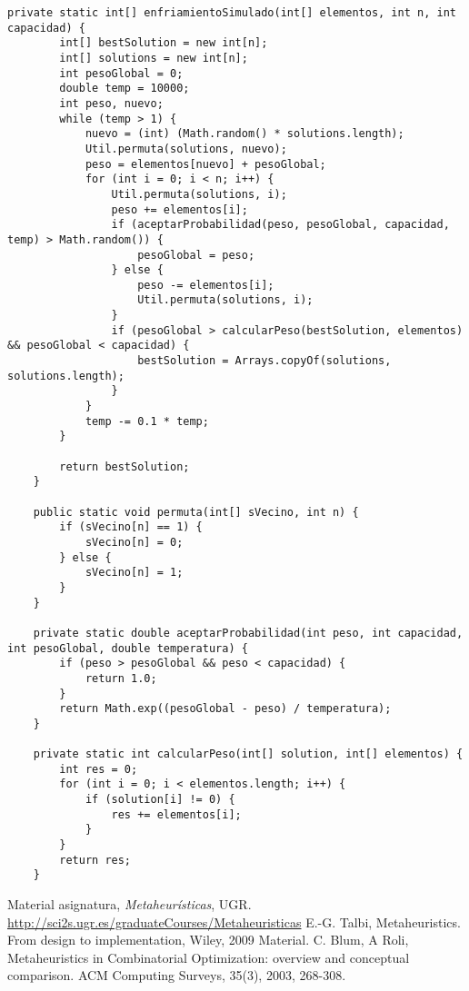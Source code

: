 \documentclass{llncs}
\begin{document}
\lstset{language=Java} 
\begin{lstlisting}
private static int[] enfriamientoSimulado(int[] elementos, int n, int capacidad) {
        int[] bestSolution = new int[n];
        int[] solutions = new int[n];
        int pesoGlobal = 0;
        double temp = 10000;
        int peso, nuevo;
        while (temp > 1) {
            nuevo = (int) (Math.random() * solutions.length);
            Util.permuta(solutions, nuevo);
            peso = elementos[nuevo] + pesoGlobal;
            for (int i = 0; i < n; i++) {
                Util.permuta(solutions, i);
                peso += elementos[i];
                if (aceptarProbabilidad(peso, pesoGlobal, capacidad, temp) > Math.random()) {
                    pesoGlobal = peso;
                } else {
                    peso -= elementos[i];
                    Util.permuta(solutions, i);
                }
                if (pesoGlobal > calcularPeso(bestSolution, elementos) && pesoGlobal < capacidad) {
                    bestSolution = Arrays.copyOf(solutions, solutions.length);
                }
            }
            temp -= 0.1 * temp;
        }

        return bestSolution;
    }
	
	public static void permuta(int[] sVecino, int n) {
        if (sVecino[n] == 1) {
            sVecino[n] = 0;
        } else {
            sVecino[n] = 1;
        }
    }    
    
    private static double aceptarProbabilidad(int peso, int capacidad, int pesoGlobal, double temperatura) {
        if (peso > pesoGlobal && peso < capacidad) {
            return 1.0;
        }
        return Math.exp((pesoGlobal - peso) / temperatura);
    }

    private static int calcularPeso(int[] solution, int[] elementos) {
        int res = 0;
        for (int i = 0; i < elementos.length; i++) {
            if (solution[i] != 0) {
                res += elementos[i];
            }
        }
        return res;
    }
\end{lstlisting}


%
%
\begin{thebibliography}{5}

  Material asignatura,
  \textit{Metaheur\'{i}sticas},
  UGR. \url{http://sci2s.ugr.es/graduateCourses/Metaheuristicas}
  E.-G. Talbi, Metaheuristics. From design to implementation,
  Wiley, 2009 Material.
	C. Blum, A Roli, Metaheuristics in Combinatorial Optimization: overview and conceptual comparison. ACM Computing Surveys, 35(3), 2003, 268-308.
 

\end{thebibliography}
\end{document}
